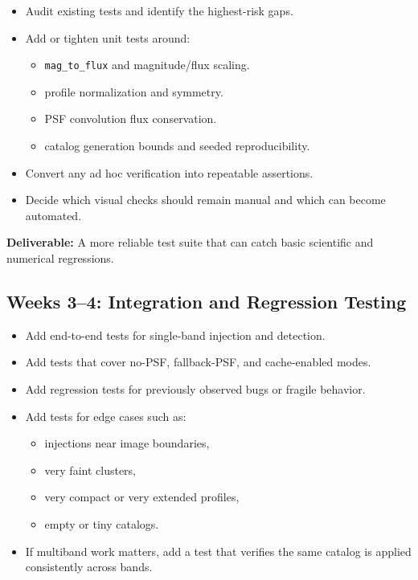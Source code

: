 \documentclass[11pt]{article}
\begin{document}
\begin{itemize}
    \item Audit existing tests and identify the highest-risk gaps.
    \item Add or tighten unit tests around:
    \begin{itemize}
        \item \texttt{mag\_to\_flux} and magnitude/flux scaling.
        \item profile normalization and symmetry.
        \item PSF convolution flux conservation.
        \item catalog generation bounds and seeded reproducibility.
    \end{itemize}
    \item Convert any ad hoc verification into repeatable assertions.
    \item Decide which visual checks should remain manual and which can become automated.
\end{itemize}

\noindent\textbf{Deliverable:} A more reliable test suite that can catch basic scientific and numerical regressions.

\subsection{Weeks 3--4: Integration and Regression Testing}

\begin{itemize}
    \item Add end-to-end tests for single-band injection and detection.
    \item Add tests that cover no-PSF, fallback-PSF, and cache-enabled modes.
    \item Add regression tests for previously observed bugs or fragile behavior.
    \item Add tests for edge cases such as:
    \begin{itemize}
        \item injections near image boundaries,
        \item very faint clusters,
        \item very compact or very extended profiles,
        \item empty or tiny catalogs.
    \end{itemize}
    \item If multiband work matters, add a test that verifies the same catalog is applied consistently across bands.
\end{itemize}
\end{document}
